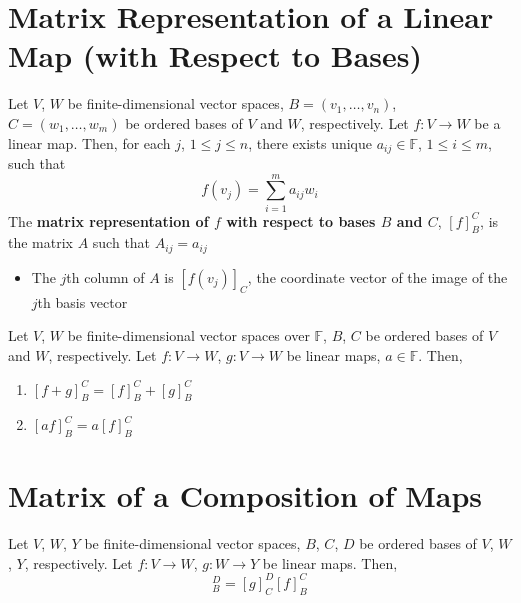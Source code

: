 \documentclass[letterpaper,12pt]{article}
\begin{document}
\section*{Matrix Representation of a Linear Map (with Respect to Bases)}
\begin{definition}
Let $V$, $W$ be finite-dimensional vector spaces, $B = (v_1, \dots, v_n)$, $C = (w_1, \dots, w_m)$ be ordered bases of $V$ and $W$, respectively. Let $f: V \rightarrow W$ be a linear map. Then, for each $j$, $1 \leq j \leq n$, there exists unique $a_{ij} \in \mathbb{F}$, $1 \leq i \leq m$, such that
\begin{equation*}
    f(v_j) = \sum_{i=1}^m a_{ij} w_i
\end{equation*}
The \textbf{matrix representation of $f$ with respect to bases $B$ and $C$}, $[f]_{B}^{C}$, is the matrix $A$ such that $A_{ij} = a_{ij}$
\begin{itemize}
    \item The $j$th column of $A$ is $[f(v_j)]_{C}$, the coordinate vector of the image of the $j$th basis vector
\end{itemize}
\end{definition}

\begin{theorem}
Let $V$, $W$ be finite-dimensional vector spaces over $\mathbb{F}$, $B$, $C$ be ordered bases of $V$ and $W$, respectively. Let $f: V \rightarrow W$, $g: V \rightarrow W$ be linear maps, $a \in \mathbb{F}$. Then,
\begin{enumerate}
    \item $[f + g]_{B}^{C} = [f]_{B}^{C} + [g]_{B}^{C}$
    \item $[af]_{B}^{C} = a[f]_{B}^{C}$
\end{enumerate}
\end{theorem}

\section*{Matrix of a Composition of Maps}
\begin{theorem}
Let $V$, $W$, $Y$ be finite-dimensional vector spaces, $B$, $C$, $D$ be ordered bases of $V$, $W$, $Y$, respectively. Let $f: V \rightarrow W$, $g: W \rightarrow Y$ be linear maps. Then,
\begin{equation*}
    [g \circ f]_{B}^{D} = [g]_{C}^{D} [f]_{B}^{C}
\end{equation*}
\end{theorem}
\end{document}
